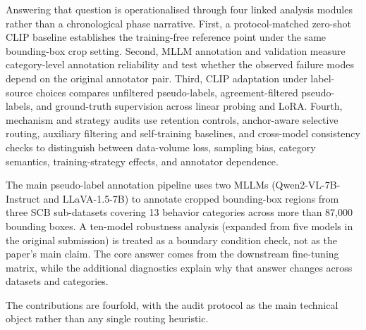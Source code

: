 \documentclass{ieeeaccess}
\begin{document}
Answering that question is operationalised through four linked analysis
modules rather than a chronological phase narrative.
First, a protocol-matched zero-shot CLIP baseline establishes the
training-free reference point under the same bounding-box crop setting.
Second, MLLM annotation and validation measure category-level
annotation reliability and test whether the observed failure modes
depend on the original annotator pair.
Third, CLIP adaptation under label-source choices compares unfiltered
pseudo-labels, agreement-filtered pseudo-labels, and ground-truth
supervision across linear probing and LoRA.
Fourth, mechanism and strategy audits use retention controls,
anchor-aware selective routing, auxiliary filtering and self-training
baselines, and cross-model consistency checks to distinguish between
data-volume loss, sampling bias, category semantics,
training-strategy effects, and annotator dependence.

The main pseudo-label annotation pipeline uses two MLLMs
(Qwen2-VL-7B-Instruct and LLaVA-1.5-7B) to annotate cropped
bounding-box regions from three SCB sub-datasets covering 13 behavior
categories across more than 87{,}000 bounding boxes.
A ten-model robustness analysis (expanded from five models in the original submission) is treated as a boundary
condition check, not as the paper's main claim.
The core answer comes from the downstream fine-tuning matrix,
while the additional diagnostics explain why that answer changes across
datasets and categories.

The contributions are fourfold, with the audit protocol as the main
technical object rather than any single routing heuristic.
\end{document}
